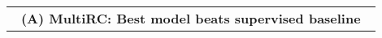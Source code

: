 \begin{table*}[t]
\begin{tabular}{@{}p{0.3\linewidth} p{0.3\linewidth} p{0.3\linewidth} @{}}
\multicolumn{3}{c}{\textbf{(A) MultiRC: Best model beats supervised baseline}}                                                                                                                                                                                                                                                                                                                                                                                                                                                                                                                                                                                                                                                                                                                                                                                                                                                                                                                                                                                                                                                                                                                                                                                                                                                                                                                                                                                                                                                                                                                                                                                                                                                                                                                                                                                                                                                                                                                                                                                                                                                                                                                                                                                                                                                                                                                                                                                                                                                                                                                                                                                                                                                                                                                                                                                                                                                                                                                                                                                                                                                                                                                                                                                                                                                                                             
\end{tabular}
\end{table*}

